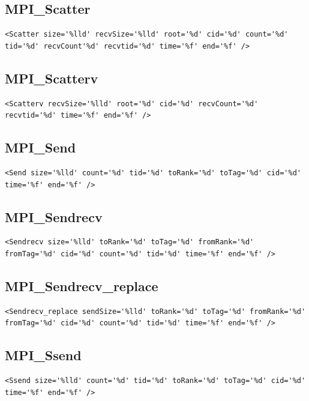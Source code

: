 \documentclass[a4paper,12pt,pdftex]{scrartcl}
\begin{document}
\subsection{MPI\_Scatter}
\begin{lstlisting}
<Scatter size='%lld' recvSize='%lld' root='%d' cid='%d' count='%d' tid='%d' recvCount'%d' recvtid='%d' time='%f' end='%f' />
\end{lstlisting}

\subsection{MPI\_Scatterv}
\begin{lstlisting}
<Scatterv recvSize='%lld' root='%d' cid='%d' recvCount='%d' recvtid='%d' time='%f' end='%f' />
\end{lstlisting}

\subsection{MPI\_Send}
\begin{lstlisting}
<Send size='%lld' count='%d' tid='%d' toRank='%d' toTag='%d' cid='%d' time='%f' end='%f' />
\end{lstlisting}

\subsection{MPI\_Sendrecv}
\begin{lstlisting}
<Sendrecv size='%lld' toRank='%d' toTag='%d' fromRank='%d' fromTag='%d' cid='%d' count='%d' tid='%d' time='%f' end='%f' />
\end{lstlisting}

\subsection{MPI\_Sendrecv\_replace}
\begin{lstlisting}
<Sendrecv_replace sendSize='%lld' toRank='%d' toTag='%d' fromRank='%d' fromTag='%d' cid='%d' count='%d' tid='%d' time='%f' end='%f' />
\end{lstlisting}

\subsection{MPI\_Ssend}
\begin{lstlisting}
<Ssend size='%lld' count='%d' tid='%d' toRank='%d' toTag='%d' cid='%d' time='%f' end='%f' />
\end{lstlisting}
\end{document}
